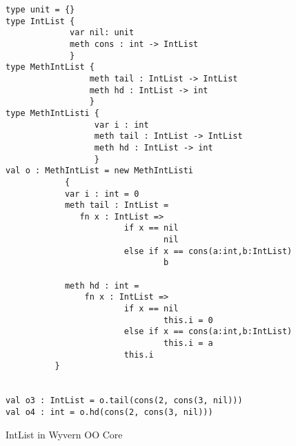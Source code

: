 \begin{figure}
  \centering
\begin{lstlisting}
type unit = {}
type IntList { 
             var nil: unit
             meth cons : int -> IntList 
             }
type MethIntList { 
                 meth tail : IntList -> IntList
                 meth hd : IntList -> int 
                 }
type MethIntListi { 
                  var i : int
                  meth tail : IntList -> IntList
                  meth hd : IntList -> int 
                  }
val o : MethIntList = new MethIntListi
            { 
            var i : int = 0
            meth tail : IntList =
               fn x : IntList =>
                        if x == nil
                                nil			      
                        else if x == cons(a:int,b:IntList)
                                b

            meth hd : int =
                fn x : IntList =>
                        if x == nil
                                this.i = 0			      
                        else if x == cons(a:int,b:IntList)
                                this.i = a
                        this.i
          }

                                           			
val o3 : IntList = o.tail(cons(2, cons(3, nil)))
val o4 : int = o.hd(cons(2, cons(3, nil)))
\end{lstlisting}
\caption{IntList in Wyvern OO Core}
\label{c-example}
\end{figure}
